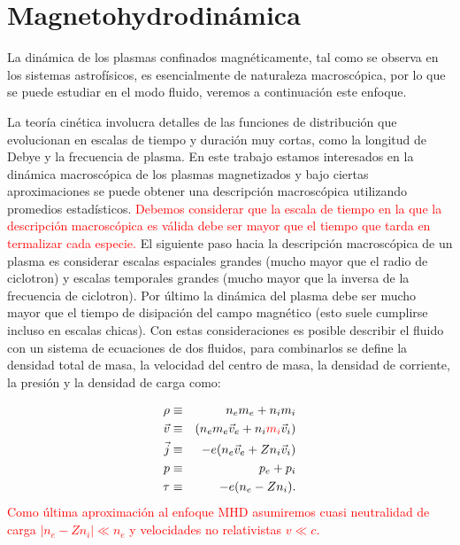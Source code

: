 \documentclass[a4paper,11pt]{report}
\begin{document}
\chapter{Magnetohydrodinámica}\label{mhd}

La dinámica de los plasmas confinados magnéticamente, tal como se observa en los sistemas astrofísicos, es esencialmente de naturaleza macroscópica, por lo que se puede estudiar en el modo fluido, veremos a continuación este enfoque. 


La teoría cinética involucra detalles de las funciones de distribución que evolucionan en escalas de tiempo y duración muy cortas, como la longitud de Debye y la frecuencia de plasma. En este trabajo estamos interesados en la dinámica macroscópica de los plasmas magnetizados y bajo ciertas aproximaciones se puede obtener una descripción macroscópica utilizando promedios estadísticos. \textcolor{red}{Debemos considerar que la escala de tiempo en la que la descripción macroscópica es válida debe ser mayor que el tiempo que tarda en termalizar cada especie.}
El siguiente paso hacia la descripción macroscópica de un plasma es considerar escalas espaciales grandes (mucho mayor que el radio de ciclotron) y escalas temporales grandes (mucho mayor que la inversa de la frecuencia de ciclotron). Por último la dinámica del plasma debe ser mucho mayor que el tiempo de disipación del campo magnético (esto suele cumplirse incluso en escalas chicas). Con estas consideraciones es posible describir el fluido con un sistema de ecuaciones de dos fluidos, para combinarlos se define la densidad total de masa, la velocidad del centro de masa, la densidad de corriente, la presión y la densidad de carga como:

\begin{eqnarray}
  \rho &\equiv&  n_e m_e + n_i m_i \label{mhd_rho}\\
  \vec{v} &\equiv& (n_e m_e \vec{v}_e + n_i \textcolor{red}{m_i} \vec{v}_i) \label{mhd_v} \\
  \vec{j} &\equiv& -e(n_e \vec{v}_e + Z n_i \vec{v}_i) \\
  p &\equiv& p_e + p_i \label{mhd_p}\\
  \tau &\equiv& -e(n_e - Zn_i). \\
\end{eqnarray}
\textcolor{red}{Como última aproximación al enfoque MHD asumiremos cuasi neutralidad de carga $|n_e - Zn_i| \ll n_e$ y velocidades no relativistas $v \ll c$.}
\end{document}
